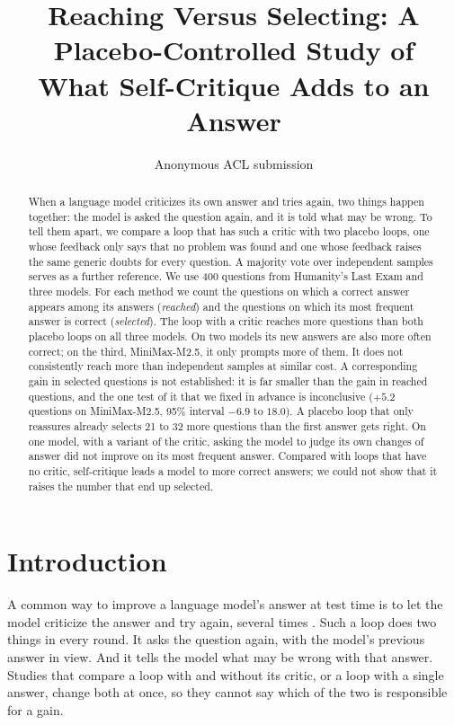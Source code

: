 \documentclass[11pt]{article}
\title{Reaching Versus Selecting: A Placebo-Controlled Study of\\What Self-Critique Adds to an Answer}
\author{Anonymous ACL submission}
\begin{document}
\maketitle

\begin{abstract}
When a language model criticizes its own answer and tries again, two things happen together: the model is asked the question again, and it is told what may be wrong.
To tell them apart, we compare a loop that has such a critic with two placebo loops, one whose feedback only says that no problem was found and one whose feedback raises the same generic doubts for every question.
A majority vote over independent samples serves as a further reference.
We use 400 questions from Humanity's Last Exam and three models.
For each method we count the questions on which a correct answer appears among its answers (\emph{reached}) and the questions on which its most frequent answer is correct (\emph{selected}).
The loop with a critic reaches more questions than both placebo loops on all three models.
On two models its new answers are also more often correct; on the third, MiniMax-M2.5, it only prompts more of them.
It does not consistently reach more than independent samples at similar cost.
A corresponding gain in selected questions is not established: it is far smaller than the gain in reached questions, and the one test of it that we fixed in advance is inconclusive ($+5.2$ questions on MiniMax-M2.5, 95\% interval $-6.9$ to $18.0$).
A placebo loop that only reassures already selects 21 to 32 more questions than the first answer gets right.
On one model, with a variant of the critic, asking the model to judge its own changes of answer did not improve on its most frequent answer.
Compared with loops that have no critic, self-critique leads a model to more correct answers; we could not show that it raises the number that end up selected.
\end{abstract}

\section{Introduction}

A common way to improve a language model's answer at test time is to let the model criticize the answer and try again, several times \citep{madaan2023selfrefine,shinn2023reflexion}.
Such a loop does two things in every round.
It asks the question again, with the model's previous answer in view.
And it tells the model what may be wrong with that answer.
Studies that compare a loop with and without its critic, or a loop with a single answer, change both at once, so they cannot say which of the two is responsible for a gain.
\end{document}
